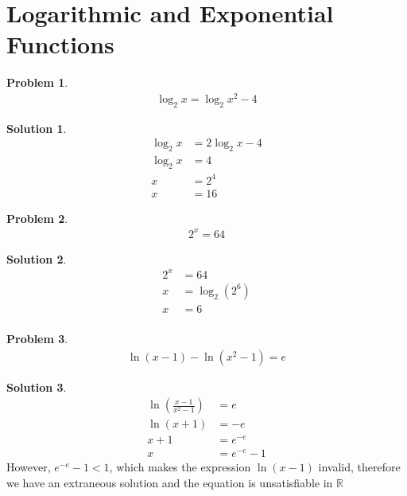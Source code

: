 \documentclass[a4paper]{article}
\theoremstyle{definition}
\newtheorem{problem}{Problem}[section]
\newtheorem*{solution}{Solution}
\begin{document}
\section{Logarithmic and Exponential Functions}

\begin{problem}
\begin{align*}
\log_2 x  = \log_2 x^2 -4
\end{align*}
\end{problem}

\begin{solution}
\begin{align*}
\log_2 x &= 2 \log_2 x - 4 \\
\log_2 x &= 4 \\
x &= 2^4 \\
x &= 16
\end{align*}
\end{solution}

\begin{problem}
\begin{align*}
2^x = 64
\end{align*}
\end{problem}

\begin{solution}
\begin{align*}
2^x &= 64 \\
x &= \log_2(2^6) \\
x &= 6 \\
\end{align*}
\end{solution}

\begin{problem}
\begin{align*}
\ln(x-1) - \ln(x^2-1) = e
\end{align*}
\end{problem}

\begin{solution}
\begin{align*}
\ln\left(\frac{x-1}{x^2-1}\right) &= e \\
\ln(x+1) &= -e \\
x+1 &= e^{-e} \\
x &= e^{-e} -1
\end{align*}
However, \(e^{-e} -1 < 1\), which makes the expression \(\ln(x-1)\) invalid, therefore we have an extraneous solution and the equation is unsatisfiable in \(\mathbb{R}\)
\end{solution}
\end{document}
